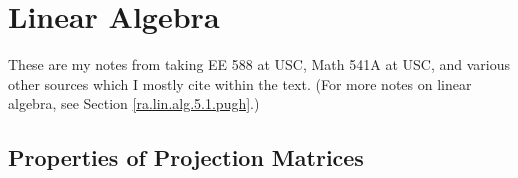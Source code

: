 %
%
%
%
%
%
%
%
%
%
%

\chapter{Linear Algebra}\label{sec.lin.alg}

These are my notes from taking EE 588 at USC, Math 541A at USC, and various other sources which I mostly cite within the text. (For more notes on linear algebra, see Section \ref{ra.lin.alg.5.1.pugh}.)

\section{Properties of Projection Matrices}

